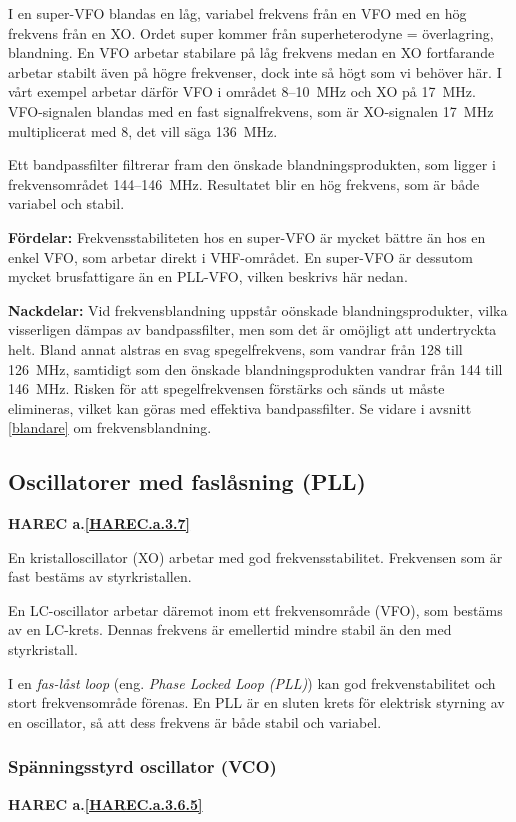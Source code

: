 I en super-VFO blandas en låg, variabel frekvens från en VFO med en hög
frekvens från en XO.
Ordet super kommer från superheterodyne = överlagring, blandning.
En VFO arbetar stabilare på låg frekvens medan en XO fortfarande arbetar
stabilt även på högre frekvenser, dock inte så högt som vi behöver här.
I vårt exempel arbetar därför VFO i området 8--10~MHz och XO på 17~MHz.
VFO-signalen blandas med en fast signalfrekvens, som är XO-signalen 17~MHz
multiplicerat med 8, det vill säga 136~MHz.

Ett bandpassfilter filtrerar fram den önskade blandningsprodukten, som
ligger i frekvensområdet 144--146~MHz.
Resultatet blir en hög frekvens, som är både variabel och stabil.

\textbf{Fördelar:}
Frekvensstabiliteten hos en super-VFO är mycket bättre än hos en enkel VFO,
som arbetar direkt i VHF-området.
En super-VFO är dessutom mycket brusfattigare än en PLL-VFO, vilken
beskrivs här nedan.

\textbf{Nackdelar:}
Vid frekvensblandning uppstår oönskade blandningsprodukter, vilka visserligen
dämpas av bandpassfilter, men som det är omöjligt att undertryckta helt.
Bland annat alstras en svag spegelfrekvens, som vandrar från 128 till 126~MHz,
samtidigt som den önskade blandningsprodukten vandrar från 144 till 146~MHz.
Risken för att spegelfrekvensen förstärks och sänds ut måste elimineras,
vilket kan göras med effektiva bandpassfilter.
Se vidare i avsnitt \ref{blandare} om frekvensblandning.

\subsection{Oscillatorer med faslåsning (PLL)}
\textbf{HAREC
  a.\ref{HAREC.a.3.7}\label{myHAREC.a.3.7}
}

En kristalloscillator (XO) arbetar med god frekvensstabilitet.
Frekvensen som är fast bestäms av styrkristallen.

En LC-oscillator arbetar däremot inom ett frekvensområde (VFO), som bestäms av
en LC-krets.
Dennas frekvens är emellertid mindre stabil än den med styrkristall.

I en \emph{fas-låst loop} (eng. \emph{Phase Locked Loop (PLL)}) kan god
frekvenstabilitet och stort frekvensområde förenas.
En PLL är en sluten krets för elektrisk styrning av en oscillator, så att dess
frekvens är både stabil och variabel.

\subsubsection{Spänningsstyrd oscillator (VCO)}
\textbf{HAREC a.\ref{HAREC.a.3.6.5}\label{myHAREC.a.3.6.5}}

